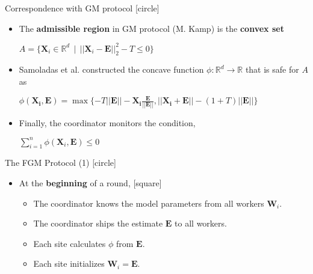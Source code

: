 \begin{frame}{Correspondence with GM protocol}
    [circle]
    \begin{itemize}
        \item{The \textbf{admissible region} in GM protocol (M. Kamp) is the \textbf{convex set}
        \newline
        \begin{center}
            $A=\{\pmb{X}_i\in\mathbb{R}^d\:\:|\:\:||\pmb{X}_i-\pmb{E}||_2^2 - T \leq 0\}$
        \end{center}
        }
        \vspace{0.4cm}
        \item{Samoladas et al. constructed the concave function $\phi:\mathbb{R}^d\rightarrow\mathbb{R}$ that is safe for $A$ as
        \newline
        \begin{center}
            $\phi(\pmb{X_i},\pmb{E}) = \max\{-T||\pmb{E}|| - \pmb{X_i}\frac{\pmb{E}}{\pmb{||E||}}, ||\pmb{X_i}+\pmb{E}|| - (1+T)||\pmb{E}||\}$
        \end{center}
        }
        \vspace{0.4cm}
        \item{Finally, the coordinator monitors the condition,
        \newline
        \begin{center}
            $\sum_{i=1}^n\phi(\pmb{X}_i,\pmb{E}) \leq 0$
        \end{center}
        }
    \end{itemize}
\end{frame}

\begin{frame}{The FGM Protocol (1)}
    [circle]
    \begin{itemize}
        \item{At the \textbf{beginning} of a round,
        \vspace{0.2cm}
        [square]
        \begin{itemize}
            \item{The coordinator knows the model parameters from all workers $\pmb{W}_i$.}
            \vspace{0.3cm}
            \item{The coordinator ships the estimate $\pmb{E}$ to all workers.}
            \vspace{0.3cm}
            \item{Each site calculates $\phi$ from $\pmb{E}$.}
            \vspace{0.3cm}
            \item{Each site initializes $\pmb{W}_i=\pmb{E}$.}
        \end{itemize}
        }
    \end{itemize}
\end{frame}

